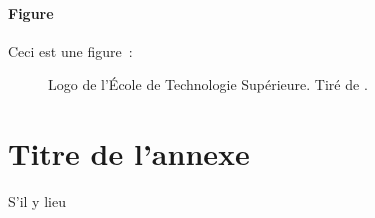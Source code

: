 \documentclass [memoire, letterpaper, oneside, 12pt]{thETS-utf8}
\begin{document}
\subsubsection{Figure}
Ceci est une figure~:
\begin{figure}[h]
  \caption{Logo de l'École de Technologie Supérieure. Tiré de \cite{ETS2010}.}
  \label{fig:logoets}
\end{figure}

%
%
%
%
%
%
%
%

\begin{conclusion}

\end{conclusion}

\begin{remerciements}

\end{remerciements}

\appendix
\multiannexe %
%
\chapter{Titre de l'annexe}
S'il y lieu


\renewcommand{\bibname}{RÉFÉRENCES BIBLIOGRAPHIQUES}

\end{document}

